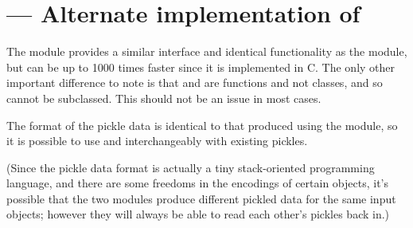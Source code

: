\section{ ---
         Alternate implementation of }



The  module provides a similar interface and identical
functionality as the  module,
but can be up to 1000 times faster since it is implemented in C.  The
only other important difference to note is that 
and  are functions and not classes, and so
cannot be subclassed.  This should not be an issue in most cases.

The format of the pickle data is identical to that produced using the
 module, so it is possible to use  and
 interchangeably with existing pickles.

(Since the pickle data format is actually a tiny stack-oriented
programming language, and there are some freedoms in the encodings of
certain objects, it's possible that the two modules produce different
pickled data for the same input objects; however they will always be
able to read each other's pickles back in.)
